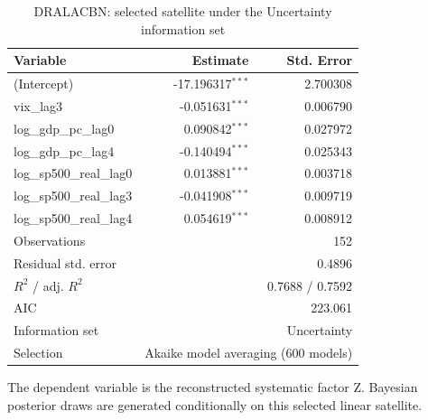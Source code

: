 \begin{table}[!htbp]
\centering
\caption{DRALACBN: selected satellite under the Uncertainty information set}
\label{tab:dralacbn_uncertainty_satellite}
\begin{tabular}{lrr}
\toprule
Variable & Estimate & Std. Error \\
\midrule
(Intercept) & -17.196317$^{***}$ & 2.700308 \\
vix_lag3 & -0.051631$^{***}$ & 0.006790 \\
log_gdp_pc_lag0 & 0.090842$^{***}$ & 0.027972 \\
log_gdp_pc_lag4 & -0.140494$^{***}$ & 0.025343 \\
log_sp500_real_lag0 & 0.013881$^{***}$ & 0.003718 \\
log_sp500_real_lag3 & -0.041908$^{***}$ & 0.009719 \\
log_sp500_real_lag4 & 0.054619$^{***}$ & 0.008912 \\
\midrule
Observations & \multicolumn{2}{r}{152} \\
Residual std. error & \multicolumn{2}{r}{0.4896} \\
$R^2$ / adj. $R^2$ & \multicolumn{2}{r}{0.7688 / 0.7592} \\
AIC & \multicolumn{2}{r}{223.061} \\
Information set & \multicolumn{2}{r}{Uncertainty} \\
Selection & \multicolumn{2}{r}{Akaike model averaging (600 models)} \\
\bottomrule
\end{tabular}
\begin{tablenotes}
\small
\item The dependent variable is the reconstructed systematic factor Z. Bayesian posterior draws are generated conditionally on this selected linear satellite.
\end{tablenotes}
\end{table}
